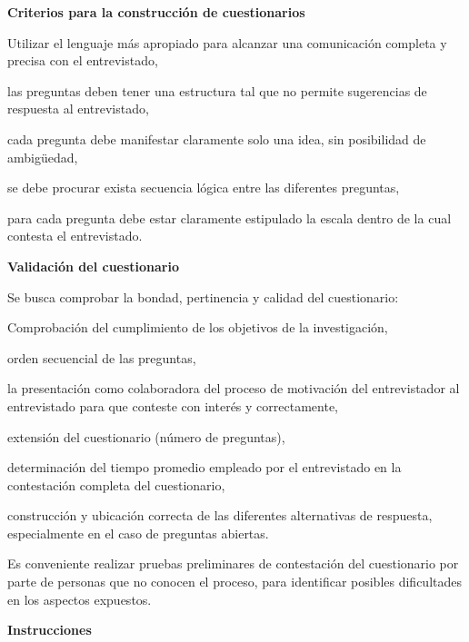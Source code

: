 \documentclass[a5paper,doc,10pt,noapacite]{apa6}
\begin{document}
{{	\vspace{0.75\baselineskip}
	\textbf{Criterios para la construcción de cuestionarios}
	
	\begin{APAitemize}
		\item Utilizar el lenguaje más apropiado para alcanzar una comunicación completa y precisa con el entrevistado,
		\item las preguntas deben tener una estructura tal que no permite sugerencias de respuesta al  entrevistado,
		\item cada pregunta debe manifestar claramente solo una idea, sin posibilidad de ambigüedad,
		\item se debe procurar exista secuencia lógica entre las diferentes preguntas,
		\item para cada pregunta debe estar claramente estipulado la escala dentro de la cual contesta el entrevistado.
	\end{APAitemize}
	
	\vspace{0.75\baselineskip}
	\textbf{Validación del cuestionario}
	
	Se busca comprobar la bondad, pertinencia y calidad del cuestionario:
	\begin{APAitemize}
		\item Comprobación del cumplimiento de los objetivos de la investigación,
		\item orden secuencial de las preguntas,
		\item la presentación como colaboradora del proceso de motivación del entrevistador al entrevistado para que conteste con interés y correctamente,
		\item extensión del cuestionario (número de preguntas),
		\item determinación del tiempo promedio empleado por el entrevistado en la contestación completa del cuestionario,
		\item construcción y ubicación correcta de las diferentes alternativas de respuesta, especialmente en el caso de preguntas abiertas.
	\end{APAitemize}
	
	\vspace{0.75\baselineskip}
	Es conveniente realizar pruebas preliminares de contestación del cuestionario por parte de personas que no conocen el proceso, para identificar posibles dificultades en los aspectos expuestos.
	
	\vspace{0.75\baselineskip}
	\textbf{Instrucciones}
	
}}
\end{document}

